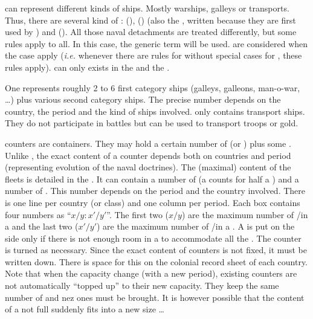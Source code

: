  \ND can represent different kinds of
ships. Mostly warships, galleys or transports.
\bparag Thus, there are several kind of \ND: 
(\NWD),  (\NGD) (also the ,
written \VGD because they are first used by \VEN) and  (\NTD).
\bparag All those naval detachments are treated differently, but some rules
apply to all. In this case, the generic term \ND will be used.
\bparag \VGD are considered \NGD when the case apply (\emph{i.e.} whenever
there are rules for \NGD without special cases for \VGD, these rules apply).
\bparag \NGD can only exists in the \regionMediterrannee and the
\regionBaltique.

\aparag[Detachments.] One \ND represents roughly 2 to 6 first category ships
(galleys, galleons, man-o-war, \ldots) plus various second category ships. The
precise number depends on the country, the period and the kind of ships
involved.
\bparag \NTD only contains transport ships. They do not participate in battles
but can be used to transport troops or gold.

\aparag[Fleets.] \FLEET counters are containers. They may hold a certain
number of \NWD (or \NGD) plus some \NTD.
\bparag Unlike \ARMY, the exact content of a \FLEET counter depends both on
countries and period (representing evolution of the naval doctrines).
\bparag The (maximal) content of the fleets is detailed in the
. It can contain a number of \NWD (a
\NGD counts for half a \NWD) and a number of \NTD. This number depends on the
period and the country involved.
\bparag There is one line per country (or class) and one column per
period. Each box contains four numbers as ``$x/y:x'/y'$''. The first two
($x/y$) are the maximum number of \NWD/\NTD in a \FLEET\facemoins and the last
two ($x'/y'$) are the maximum number of \NWD/\NTD in a \FLEET\faceplus.
\bparag A \FLEET is put on the side \Faceplus only if there is not enough room
in a \FLEET\facemoins to accommodate all the \ND. The counter is turned as
necessary.
\bparag Since the exact content of \FLEET counters is not fixed, it must be
written down. There is space for this on the colonial record sheet of each
country.
\bparag Note that when the capacity change (with a new period), existing
\FLEET counters are not automatically ``topped up'' to their new
capacity. They keep the same number of \ND and nez ones must be brought. It is
however possible that the content of a not full \FLEET\Faceplus suddenly fits
into a new size \FLEET\Facemoins\ldots


